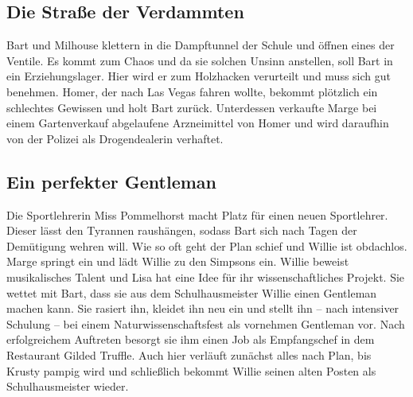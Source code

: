 \subsection{Die Straße der Verdammten}
Bart und Milhouse klettern in die Dampftunnel der Schule und öffnen eines der Ventile. Es kommt zum Chaos und da sie solchen Unsinn anstellen, soll Bart in ein Erziehungslager. Hier wird er zum Holzhacken verurteilt und muss sich gut benehmen. Homer, der nach Las Vegas fahren wollte, bekommt plötzlich ein schlechtes Gewissen und holt Bart zurück. Unterdessen verkaufte Marge bei einem Gartenverkauf abgelaufene Arzneimittel von Homer und wird daraufhin von der Polizei als Drogendealerin verhaftet.



\subsection{Ein perfekter Gentleman}\label{HABF05}
Die Sportlehrerin Miss Pommelhorst macht Platz für einen neuen Sportlehrer. Dieser lässt den Tyrannen raushängen, sodass Bart sich nach Tagen der Demütigung wehren will. Wie so oft geht der Plan schief und Willie ist obdachlos. Marge springt ein und lädt Willie zu den Simpsons ein. Willie beweist musikalisches Talent und Lisa hat eine Idee für ihr wissenschaftliches Projekt. Sie wettet mit Bart, dass sie aus dem Schulhausmeister Willie einen Gentleman machen kann. Sie rasiert ihn, kleidet ihn neu ein und stellt ihn -- nach intensiver Schulung -- bei einem Naturwissenschaftsfest als vornehmen Gentleman vor. Nach erfolgreichem Auftreten besorgt sie ihm einen Job als Empfangschef in dem Restaurant \glqq Gilded Truffle\grqq . Auch hier verläuft zunächst alles nach Plan, bis Krusty pampig wird und schließlich bekommt Willie seinen alten Posten als Schulhausmeister wieder.


